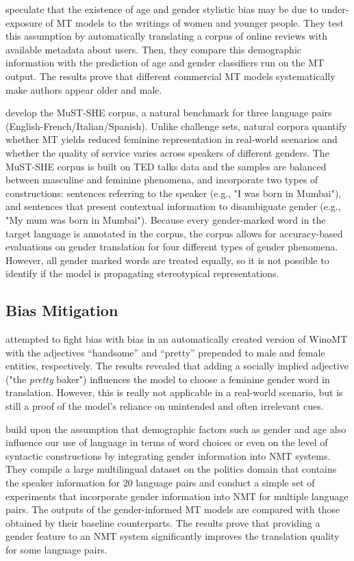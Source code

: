 \citet{Hovy_2020} speculate that the existence of age and gender stylistic bias may be due to under-exposure of MT models to the writings of women and younger people. They test this assumption by automatically translating a corpus of online reviews with available metadata about users. Then, they compare this demographic information with the prediction of age and gender classifiers run on the MT output. The results prove that different commercial MT models systematically make authors appear older and male.

\citet{MuST-SHE} develop the MuST-SHE corpus, a natural benchmark for three language pairs (English-French/Italian/Spanish). Unlike challenge sets, natural corpora quantify whether MT yields reduced feminine representation in real-world scenarios and whether the quality of service varies across speakers of different genders. The MuST-SHE corpus is built on  TED talks data and the samples are balanced between masculine and feminine phenomena, and incorporate two types of constructions: sentences referring to the speaker (e.g., "I was born in Mumbai"), and sentences that present contextual information to disambiguate gender (e.g., "My mum was born in Mumbai"). Because every gender-marked word in the target language is annotated in the corpus, the corpus allows for accuracy-based evaluations on gender translation for four different types of gender phenomena. However, all gender marked words are treated equally, so it is not possible to identify if the model is propagating stereotypical representations.


\subsection{Bias Mitigation}
\label{sec:Background:Bias_Mitigation}

\citet{Stanovsky_2019} attempted to fight bias with bias in an automatically created version of WinoMT with the adjectives “handsome” and “pretty” prepended to male and female entities, respectively. The results revealed that adding a socially implied adjective ("the \textit{pretty} baker") influences the model to choose a feminine gender word in translation. However, this is really not applicable in a real-world scenario, but is still a proof of the model’s reliance on unintended and often irrelevant cues.

\citet{Vanmassenhove_2018} build upon the assumption that demographic factors such as gender and age also influence our use of language in terms of word choices or even on the level of syntactic constructions by integrating gender information into NMT systems. They compile a large multilingual dataset on the politics domain that contains the speaker information for 20 language pairs and conduct a simple set of experiments that incorporate gender information into NMT for multiple language pairs. The outputs of the gender-informed MT models are compared with those obtained by their baseline counterparts. The results prove that providing a gender feature to an NMT system significantly improves the translation quality for some language pairs.


